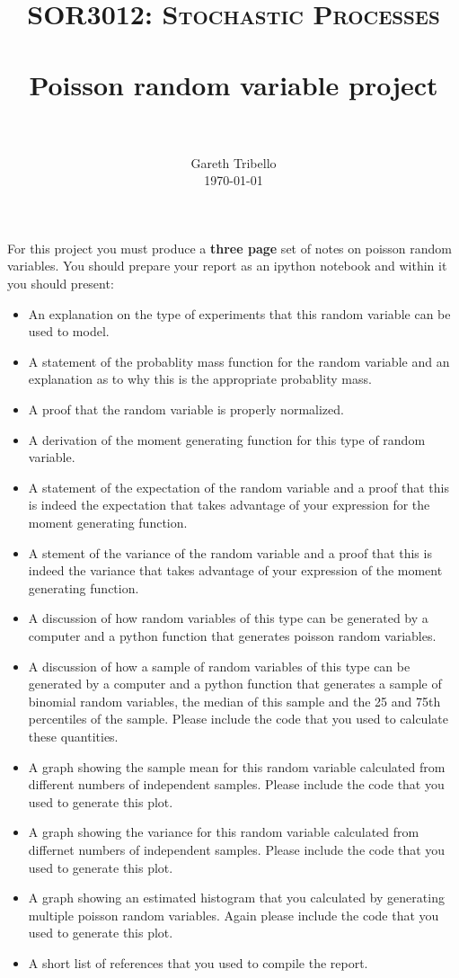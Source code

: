 \documentclass[paper=a4, fontsize=11pt]{scrartcl}
\title{\usefont{OT1}{bch}{b}{n} \normalfont \normalsize \textsc{SOR3012:
Stochastic Processes} \\ [25pt] \horrule{0.5pt} \\[0.4cm] 
\huge Poisson random variable project \\
\horrule{2pt} \\[0.25cm]
}
\author{ \normalfont
\normalsize
        Gareth Tribello \\[-3pt] \normalsize
        \today
}
\date{}
\numberwithin{equation}{section}
\numberwithin{figure}{section}
\numberwithin{table}{section}
\begin{document}
\maketitle

For this project you must produce a {\bf three page} set of notes on poisson random variables.  You should prepare your report as an ipython notebook and within it you should present:

\begin{itemize}
 \item An explanation on the type of experiments that this random variable can be used to model. 
 \item A statement of the probablity mass function for the random variable and an explanation as to why this is the appropriate probablity mass.
 \item A proof that the random variable is properly normalized.
 \item A derivation of the moment generating function for this type of random variable.
 \item A statement of the expectation of the random variable and a proof that this is indeed the expectation that takes advantage of your expression for the moment generating function.
 \item A stement of the variance of the random variable and a proof that this is indeed the variance that takes advantage of your expression of the moment generating function.
 \item A discussion of how random variables of this type can be generated by a computer and a python function that generates poisson random variables.
 \item A discussion of how a sample of random variables of this type can be generated by a computer and a python function that generates a sample of binomial random variables, the median of this sample and the 25 and 75th percentiles of the sample.  Please include the code that you used to calculate these quantities.
 \item A graph showing the sample mean for this random variable calculated from different numbers of independent samples.  Please include the code that you used to generate this plot.
 \item A graph showing the variance for this random variable calculated from differnet numbers of independent samples.  Please include the code that you used to generate this plot. 
 \item A graph showing an estimated histogram that you calculated by generating multiple poisson random variables.  Again please include the code that you used to generate this plot.
 \item A short list of references that you used to compile the report.
\end{itemize}
\end{document}
